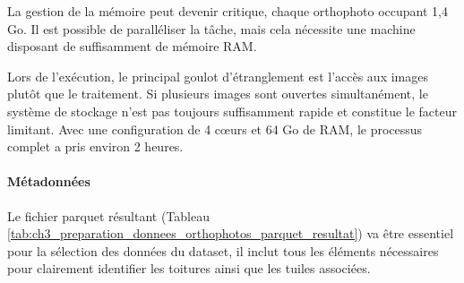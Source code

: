 La gestion de la mémoire peut devenir critique, chaque orthophoto occupant 1,4 Go. Il est possible de paralléliser la tâche, mais cela nécessite une machine disposant de suffisamment de mémoire RAM. 

Lors de l'exécution, le principal goulot d'étranglement est l'accès aux images plutôt que le traitement. Si plusieurs images sont ouvertes simultanément, le système de stockage n'est pas toujours suffisamment rapide et constitue le facteur limitant. Avec une configuration de 4 cœurs et 64 Go de RAM, le processus complet a pris environ 2 heures.

\paragraph{Métadonnées}
Le fichier parquet résultant (Tableau \ref{tab:ch3_preparation_donnees_orthophotos_parquet_resultat}) va être essentiel pour la sélection des données du dataset, il inclut tous les éléments nécessaires pour clairement identifier les toitures ainsi que les tuiles associées.
